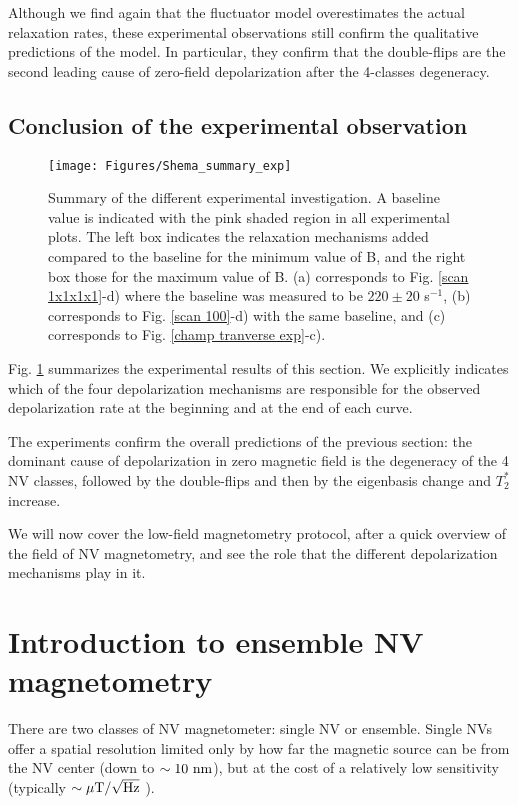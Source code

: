 \documentclass[a4paper,11pt]{report}
\begin{document}
Although we find again that the fluctuator model overestimates the actual relaxation rates, these experimental observations still confirm the qualitative predictions of the model. In particular, they confirm that the double-flips are the second leading cause of zero-field depolarization after the 4-classes degeneracy.

\subsection{Conclusion of the experimental observation}

\begin{figure}[h!]
\centering
\texttt{[image: Figures/Shema\_summary\_exp]}
\caption{Summary of the different experimental investigation. A baseline value is indicated with the pink shaded region in all experimental plots. The left box indicates the relaxation mechanisms added compared to the baseline for the minimum value of B, and the right box those for the maximum value of B. (a) corresponds to Fig. \ref{scan 1x1x1x1}-d) where the baseline was measured to be $220\pm 20$ s$^{-1}$, (b) corresponds to Fig. \ref{scan 100}-d) with the same baseline, and (c) corresponds to Fig. \ref{champ tranverse exp}-c).}
\label{summary_exp}
\end{figure}

Fig. \ref{summary_exp} summarizes the experimental results of this section. We explicitly indicates which of the four depolarization mechanisms are responsible for the observed depolarization rate at the beginning and at the end of each curve.

The experiments confirm the overall predictions of the previous section: the dominant cause of depolarization in zero magnetic field is the degeneracy of the 4 NV classes, followed by the double-flips and then by the eigenbasis change and $T_2^*$ increase.

We will now cover the low-field magnetometry protocol, after a quick overview of the field of NV magnetometry, and see the role that the different depolarization mechanisms play in it.


\section{Introduction to ensemble NV magnetometry}
\label{sec 4.4}

There are two classes of NV magnetometer: single NV or ensemble. Single NVs offer a spatial resolution limited only by how far the magnetic source can be from the NV center (down to $\sim 10\ \rm nm$), but at the cost of a relatively low sensitivity (typically $\sim \mu \rm{T} / \sqrt{\rm Hz}$ \citep{pelliccione2016scanned}).
\end{document}
